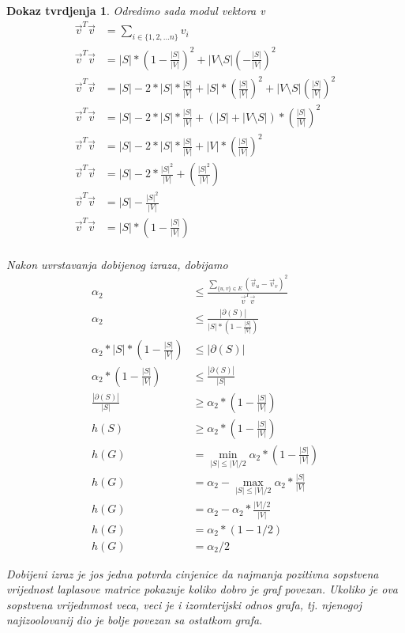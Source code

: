 \documentclass[11pt]{article}
\newtheorem*{custom_proof}{Dokaz tvrdjenja}
\begin{document}
\begin{custom_proof}
        Odredimo sada modul vektora v
        \[
            \begin{split}
                \vec{v}^T\vec{v} & = \sum_{i \in \{1,2, \dots n\}} v_i \\ 
                \vec{v}^T\vec{v} & = |S| * (1 - \frac{|S|}{|V|})^2 + |V \setminus S| (-\frac{|S|}{|V|})^2 \\ 
                \vec{v}^T\vec{v} & = |S| - 2 * |S| * \frac{|S|}{|V|} + |S| * (\frac{|S|}{|V|})^2 + |V \setminus S| (\frac{|S|}{|V|})^2 \\ 
                \vec{v}^T\vec{v} & = |S| - 2 * |S| * \frac{|S|}{|V|} + (|S| + |V \setminus S|) * (\frac{|S|}{|V|})^2 \\ 
                \vec{v}^T\vec{v} & = |S| - 2 * |S| * \frac{|S|}{|V|} + |V| * (\frac{|S|}{|V|})^2 \\ 
                \vec{v}^T\vec{v} & = |S| - 2 * \frac{|S|^2}{|V|} + (\frac{|S|^2}{|V|}) \\ 
                \vec{v}^T\vec{v} & = |S| - \frac{|S|^2}{|V|} \\ 
                \vec{v}^T\vec{v} & = |S| * ( 1 - \frac{|S|}{|V|}) \\ 
            \end{split}
            \]
            
            Nakon uvrstavanja dobijenog izraza, dobijamo
            \[
            \begin{split}
                \alpha_2  & \leq \frac{ \sum_{\{u,v\} \in E} (\vec{v}_u - \vec{v}_v)^2}{\vec{v}^T \vec{v}} \\
                \alpha_2  & \leq \frac{ |\partial(S)|}{|S| * ( 1 - \frac{|S|}{|V|})} \\ 
                \alpha_2 * |S| * ( 1 - \frac{|S|}{|V|}) & \leq |\partial(S)| \\
                \alpha_2 * ( 1 - \frac{|S|}{|V|}) & \leq \frac{|\partial(S)|}{|S|} \\ 
                \frac{|\partial(S)|}{|S|} & \geq  \alpha_2 * ( 1 - \frac{|S|}{|V|}) \\ 
                h(S) & \geq  \alpha_2 * ( 1 - \frac{|S|}{|V|}) \\ 
                h(G) & = \min_{|S| \leq |V| / 2}  \alpha_2 * ( 1 - \frac{|S|}{|V|}) \\ 
                h(G) & = \alpha_2  - \max_{|S| \leq |V| / 2}  \alpha_2 * \frac{|S|}{|V|} \\ 
                h(G) & = \alpha_2  - \alpha_2 * \frac{|V|/2}{|V|} \\ 
                h(G) & = \alpha_2  * (1 - 1/2) \\ 
                h(G) & = \alpha_2 / 2  
            \end{split}
            \]

            Dobijeni izraz je jos jedna potvrda cinjenice da najmanja pozitivna sopstvena vrijednost laplasove matrice pokazuje koliko dobro je graf povezan.
            Ukoliko je ova sopstvena vrijednmost veca, veci je i izomterijski odnos grafa, tj. njenogoj najizoolovanij dio je bolje povezan sa ostatkom grafa.

    \end{custom_proof}
\end{document}
